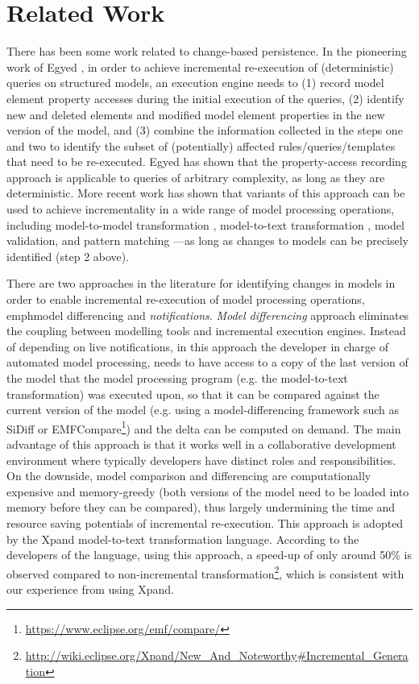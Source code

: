 \documentclass[sigconf]{acmart}
\begin{document}
\section{Related Work}
\label{sec:related_work}
There has been some work related to change-based persistence. In the pioneering work of Egyed \cite{egyed2011automatically}, in order to achieve incremental re-execution of (deterministic) queries on structured models, an execution engine needs to (1) record model element property accesses during the initial execution of the queries, (2) identify new and deleted elements and modified model element properties in the new version of the model, and (3) combine the information collected in the steps one and two to identify the subset of (potentially) affected rules/queries/templates that need to be re-executed. Egyed has shown that the property-access recording approach is applicable to queries of arbitrary complexity, as long as they are deterministic. More recent work has shown that variants of this approach can be used to achieve incrementality in a wide range of model processing operations, including model-to-model transformation \cite{jouault2010towards}, model-to-text transformation \cite{ogunyomi2015property}, model validation, and pattern matching \cite{rath2012derived}---as long as changes to models can be precisely identified (step 2 above).

There are two approaches in the literature for identifying changes in models in order to enable incremental re-execution of model processing operations, emph{model differencing} and \emph{notifications}. \emph{Model differencing} approach eliminates the coupling between modelling tools and incremental execution engines. Instead of depending on live notifications, in this approach the developer in charge of automated model processing, needs to have access to a copy of the last version of the model that the model processing program (e.g. the model-to-text transformation) was executed upon, so that it can be compared against the current version of the model (e.g. using a model-differencing framework such as SiDiff \cite{kelter2005generic} or EMFCompare\footnote{\url{https://www.eclipse.org/emf/compare/}}) and the delta can be computed on demand. The main advantage of this approach is that it works well in a collaborative development environment where typically developers have distinct roles and responsibilities. On the downside, model comparison and differencing are computationally expensive and memory-greedy (both versions of the model need to be loaded into memory before they can be compared), thus largely undermining the time and resource saving potentials of incremental re-execution. This approach is adopted by the Xpand model-to-text transformation language. According to the developers of the language, using this approach, a speed-up of only around 50\% is observed compared to non-incremental transformation\footnote{\url{http://wiki.eclipse.org/Xpand/New_And_Noteworthy\#Incremental_Generation}}, which is consistent with our experience from using Xpand.
\end{document}
